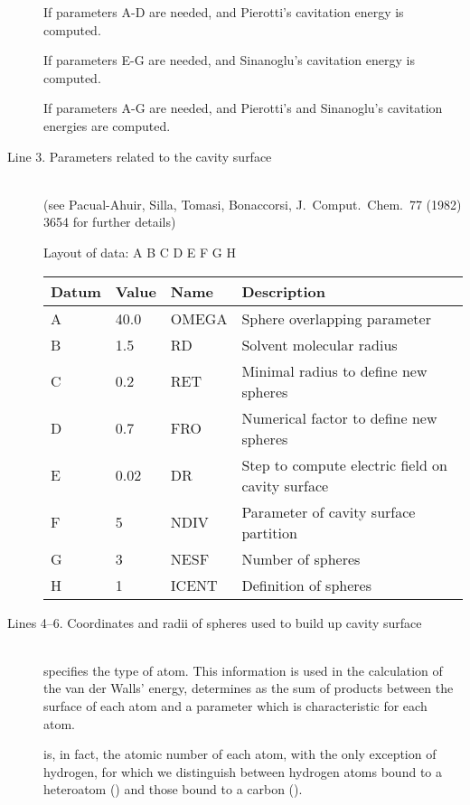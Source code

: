 \begin{description}
If  parameters A-D are needed, and Pierotti's cavitation energy
is  computed. 

If  parameters E-G are needed, and Sinanoglu's cavitation energy
is  computed.  

If  parameters A-G are needed, and Pierotti's and Sinanoglu's
cavitation energies are computed.

\item[Line 3. Parameters related to the cavity surface]~\\
(see Pacual-Ahuir, Silla, Tomasi, Bonaccorsi, J.\ Comput.\ Chem.\ 77 (1982)
3654 for further details)   

Layout of data: A B C D E F G H

\begin{center}
\begin{tabular}{llll} 
\hline
 Datum & Value & Name   &  Description  \\ \hline
A & 40.0 & OMEGA  &  Sphere overlapping parameter \\
B & 1.5  & RD     &  Solvent molecular radius \\
C & 0.2  & RET    &  Minimal radius to define new spheres \\
D & 0.7  & FRO    &  Numerical factor to define new spheres \\
E & 0.02 & DR     &  Step to compute electric field on cavity surface \\
F &  5   & NDIV   &  Parameter of cavity surface partition \\
G &  3   & NESF   &  Number of spheres \\
H &  1   & ICENT  &  Definition of spheres \\
\hline
\end{tabular}
\end{center}

\item[Lines 4--6. Coordinates and radii of spheres used to build up cavity surface]~\\
 specifies the type of atom.  This information is used  in the
calculation of the van der Walls' energy, determines as the sum of products
between the surface of each atom and a parameter which is  characteristic for
each atom.

 is, in fact, the atomic number of each atom, with the only
exception of hydrogen, for which we distinguish between  hydrogen atoms bound
to a heteroatom () and those bound to a carbon
().


\end{description}
